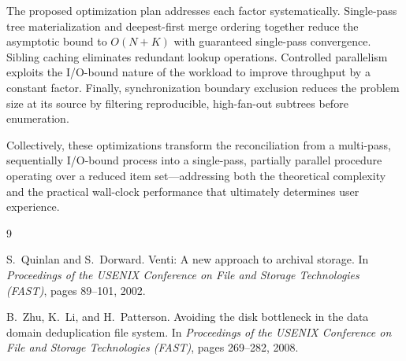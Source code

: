 \documentclass[12pt,a4paper]{article}
\begin{document}
The proposed optimization plan addresses each factor systematically. Single-pass tree materialization and deepest-first merge ordering together reduce the asymptotic bound to $O(N + K)$ with guaranteed single-pass convergence. Sibling caching eliminates redundant lookup operations. Controlled parallelism exploits the I/O-bound nature of the workload to improve throughput by a constant factor. Finally, synchronization boundary exclusion reduces the problem size at its source by filtering reproducible, high-fan-out subtrees before enumeration.

Collectively, these optimizations transform the reconciliation from a multi-pass, sequentially I/O-bound process into a single-pass, partially parallel procedure operating over a reduced item set---addressing both the theoretical complexity and the practical wall-clock performance that ultimately determines user experience.



\begin{thebibliography}{9}

S.~Quinlan and S.~Dorward.
\newblock Venti: A new approach to archival storage.
\newblock In \emph{Proceedings of the USENIX Conference on File and Storage Technologies (FAST)}, pages 89--101, 2002.

B.~Zhu, K.~Li, and H.~Patterson.
\newblock Avoiding the disk bottleneck in the data domain deduplication file system.
\newblock In \emph{Proceedings of the USENIX Conference on File and Storage Technologies (FAST)}, pages 269--282, 2008.

\end{thebibliography}
\end{document}
